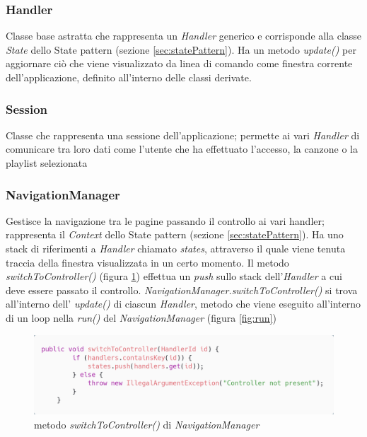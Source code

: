 \documentclass{article}
\begin{document}
  \subsubsection{Handler}
  Classe base astratta che rappresenta un \textit{Handler} generico e corrisponde alla classe \textit{State} dello State pattern (sezione \ref{sec:statePattern}). Ha un metodo \textit{update()} per aggiornare ciò che viene visualizzato da linea di comando come finestra corrente dell'applicazione, definito all'interno delle classi derivate.

  \subsubsection{Session}
  Classe che rappresenta una sessione dell'applicazione; permette ai vari \textit{Handler} di comunicare tra loro dati come l'utente che ha effettuato l'accesso, la canzone o la playlist selezionata

  \subsubsection{NavigationManager}
  \label{sec:navManager}
  Gestisce la navigazione tra le pagine passando il controllo ai vari handler; rappresenta il \textit{Context} dello State pattern (sezione \ref{sec:statePattern}). Ha uno stack di riferimenti a \textit{Handler} chiamato \textit{states}, attraverso il quale viene tenuta traccia della finestra visualizzata in un certo momento. Il metodo \textit{switchToController()} (figura \ref{fig:switchToController}) effettua un \textit{push} sullo stack dell'\textit{Handler} a cui deve essere passato il controllo. \textit{NavigationManager.switchToController()} si trova all'interno dell' \textit{update()} di ciascun \textit{Handler}, metodo che viene eseguito all'interno di un loop nella \textit{run()} del \textit{NavigationManager} (figura \ref{fig:run})

  \begin{figure}[H]
    \centering
    \includegraphics[width=0.8\linewidth]{switchToController.png}
    \caption{metodo \textit{switchToController()} di \textit{NavigationManager}}
    \label{fig:switchToController}
  \end{figure}
\end{document}
